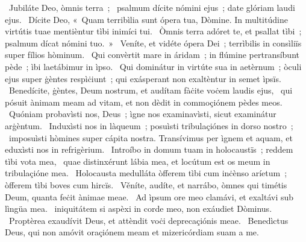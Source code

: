 ~Jubiláte Deo, òmnis terra~; 
~psalmum dícite nómini ejus~; date glóriam laudi ejus. 
~Dícite Deo, «~Quam terribìlia sunt ópera tua, Dòmine. In multitúdine virtútis tuae mentièntur tìbi inimíci tui. 
~Òmnis terra adóret te, et psallat tìbi~; psalmum dícat nómini tuo.~»
~Veníte, et vidéte ópera Dei~; terrìbilis in consìliïs super fílios hòminum. 
~Qui convèrtit mare in áridam~; in flúmine pertransíbunt pède~; ìbi laetábimur in ìpso. 
~Qui dominátur in virtúte sua in aetèrnum~; òculi ejus super ġèntes respìċiunt~; qui exásperant non exaltèntur in semet ìpsïs. 
~Benedícite, ġèntes, Deum nostrum, et audítam fàċite voċem laudis ejus, 
~qui pósuit ànimam meam ad vitam, et non dèdit in commoçiónem pèdes meos. 
~Quóniam probavìsti nos, Deus~; ìgne nos examinavìsti, sicut examinátur arġèntum. 
~Induxìsti nos in làqueum~; posuìsti tribulaçiónes in dorso nostro~; 
~imposuìsti hòmines super cápita nostra. Transívimus per ìgnem et aquam, et eduxìsti nos in refrigèrium. 
~Introíbo in domum tuam in holocaustïs~; reddem tìbi vota mea, 
~quae distinxérunt lábia mea, et locútum est os meum in tribulaçióne mea. 
~Holocausta medulláta òfferem tìbi cum inċènso aríetum~; òfferem tìbi boves cum hircïs. 
~Věníte, audíte, et narrábo, òmnes qui timétis Deum, quanta feċit ànimae meae. 
~Ad ìpsum ore meo clamávi, et exaltávi sub lìngüa mea. 
~iniquitátem si aspèxi in corde meo, non exáudiet Dòminus. 
~Proptèrea exaudívit Deus, et attèndit voċi deprecaçiónis meae. 
~Benedìctus Deus, qui non amóvit oraçiónem meam et mizericórdiam suam a me. 
